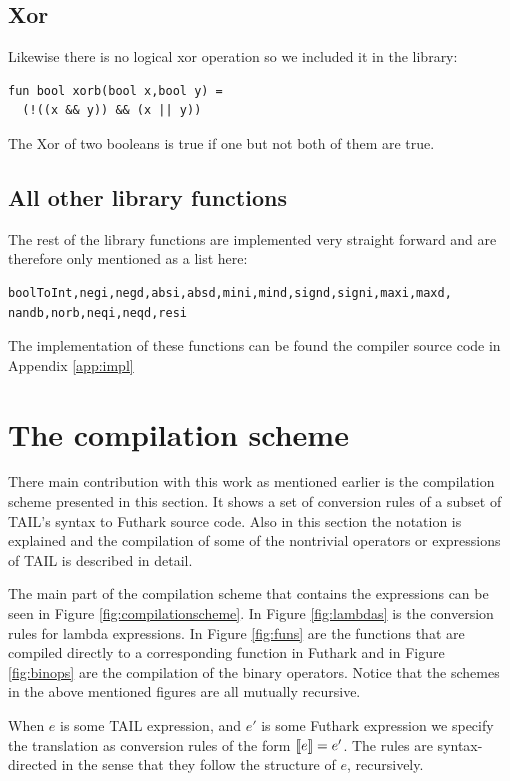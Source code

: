 \documentclass[11pt]{article}
\begin{document}
\subsection{Xor} Likewise there is no logical xor operation so we included it in the library:

\begin{lstlisting}[language=Futhark]
fun bool xorb(bool x,bool y) =
  (!((x && y)) && (x || y))
\end{lstlisting}

The Xor of two booleans is true if one but not both of them are true.

\subsection{All other library functions}
The rest of the library functions are implemented very straight forward and are therefore only mentioned as a list here:

\begin{lstlisting}[numbers=none,frame=none]
boolToInt,negi,negd,absi,absd,mini,mind,signd,signi,maxi,maxd,
nandb,norb,neqi,neqd,resi
\end{lstlisting}
The implementation of these functions can be found the compiler source code in Appendix \ref{app:impl}

\section{The compilation scheme}
\label{sec:scheme}

There main contribution with this work as mentioned earlier is the compilation scheme presented in this section.
It shows a set of conversion rules of a subset of TAIL's syntax to Futhark source code.
Also in this section the notation is explained and the compilation of some of the nontrivial operators or expressions of TAIL is described in detail. 

The main part of the compilation scheme that contains the expressions can be seen in Figure
\ref{fig:compilationscheme}.
In Figure \ref{fig:lambdas} is the conversion rules for lambda expressions.
In Figure \ref{fig:funs} are the functions that are compiled directly to a corresponding function in Futhark and in Figure \ref{fig:binops} are the compilation of the binary operators. Notice that the schemes in the above mentioned figures are all mutually recursive. 

When $e$ is some TAIL expression, and $e'$ is some Futhark expression we specify the translation as conversion rules of the form $\llbracket e \rrbracket = e'$. The rules are syntax-directed in the sense that they follow the structure of $e$, recursively. 
\end{document}
